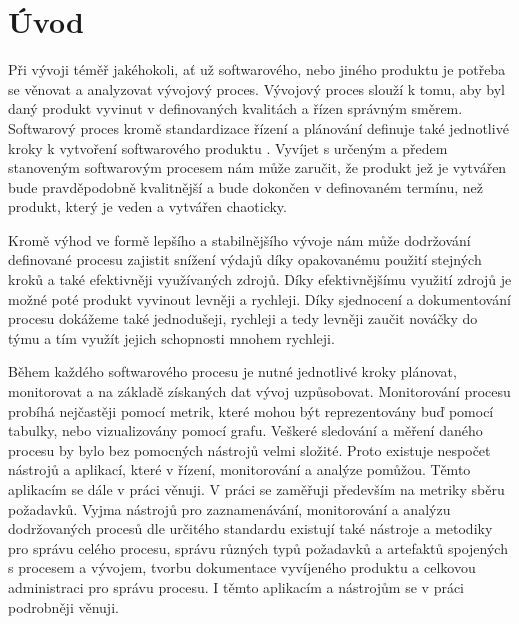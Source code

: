 \documentclass[czech,master]{diploma}
\begin{document}
\MakeTitlePages


\lstlistoflistings

\chapter{Úvod}
\label{sec:Introduction}

Při vývoji téměř jakéhokoli, ať už softwarového, nebo jiného produktu je potřeba se věnovat a analyzovat vývojový proces. Vývojový proces slouží k tomu, aby byl daný produkt vyvinut v definovaných kvalitách a řízen správným směrem. Softwarový proces kromě standardizace řízení a plánování definuje také jednotlivé kroky k vytvoření softwarového produktu \cite{ref:sommerrville_sw_process}. Vyvíjet s určeným a předem stanoveným softwarovým procesem nám může zaručit, že produkt jež je vytvářen bude pravděpodobně kvalitnější a bude dokončen v definovaném termínu, než produkt, který je veden a vytvářen chaoticky.

Kromě výhod ve formě lepšího a stabilnějšího vývoje nám může dodržování definované procesu zajistit snížení výdajů díky opakovanému použití stejných kroků a také efektivněji využívaných zdrojů. Díky efektivnějšímu využití zdrojů je možné poté produkt vyvinout levněji a rychleji. Díky sjednocení a dokumentování procesu dokážeme také jednodušeji, rychleji a tedy levněji zaučit nováčky do týmu a tím využít jejich schopnosti mnohem rychleji.

Během každého softwarového procesu je nutné jednotlivé kroky plánovat, monitorovat a na základě získaných dat vývoj uzpůsobovat. Monitorování procesu probíhá nejčastěji pomocí metrik, které mohou být reprezentovány buď pomocí tabulky, nebo vizualizovány pomocí grafu. Veškeré sledování a měření daného procesu by bylo bez pomocných nástrojů velmi složité. Proto existuje nespočet nástrojů a aplikací, které v řízení, monitorování a analýze pomůžou. Těmto aplikacím se dále v práci věnuji. V práci se zaměřuji především na metriky sběru požadavků. Vyjma nástrojů pro zaznamenávání, monitorování a analýzu dodržovaných procesů dle určitého standardu existují také nástroje a metodiky pro správu celého procesu, správu různých typů požadavků a artefaktů spojených s procesem a vývojem, tvorbu dokumentace vyvíjeného produktu a celkovou administraci pro správu procesu. I těmto aplikacím a nástrojům se v práci podrobněji věnuji. 
\end{document}
